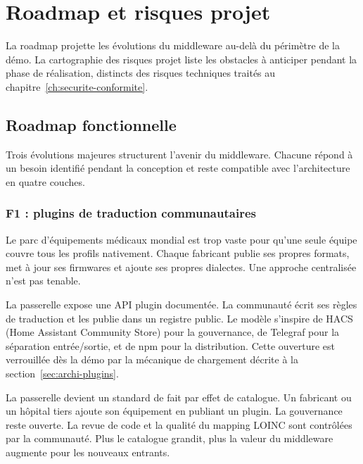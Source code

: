 \chapter{Roadmap et risques projet}
\label{ch:roadmap-risques}

La roadmap projette les évolutions du middleware au-delà du périmètre de la démo. La cartographie des risques projet liste les obstacles à anticiper pendant la phase de réalisation, distincts des risques techniques traités au chapitre~\ref{ch:securite-conformite}.

\section{Roadmap fonctionnelle}
\label{sec:roadmap-fonctionnelle}

Trois évolutions majeures structurent l'avenir du middleware. Chacune répond à un besoin identifié pendant la conception et reste compatible avec l'architecture en quatre couches.

\subsection{F1 : plugins de traduction communautaires}
\label{sec:roadmap-f1}

Le parc d'équipements médicaux mondial est trop vaste pour qu'une seule équipe couvre tous les profils nativement. Chaque fabricant publie ses propres formats, met à jour ses firmwares et ajoute ses propres dialectes. Une approche centralisée n'est pas tenable.

La passerelle expose une API plugin documentée. La communauté écrit ses règles de traduction et les publie dans un registre public. Le modèle s'inspire de HACS (Home Assistant Community Store) pour la gouvernance, de Telegraf pour la séparation entrée/sortie, et de npm pour la distribution. Cette ouverture est verrouillée dès la démo par la mécanique de chargement décrite à la section~\ref{sec:archi-plugins}.

\begin{bridgekey}
La passerelle devient un standard de fait par effet de catalogue. Un fabricant ou un hôpital tiers ajoute son équipement en publiant un plugin. La gouvernance reste ouverte. La revue de code et la qualité du mapping LOINC sont contrôlées par la communauté. Plus le catalogue grandit, plus la valeur du middleware augmente pour les nouveaux entrants.
\end{bridgekey}

